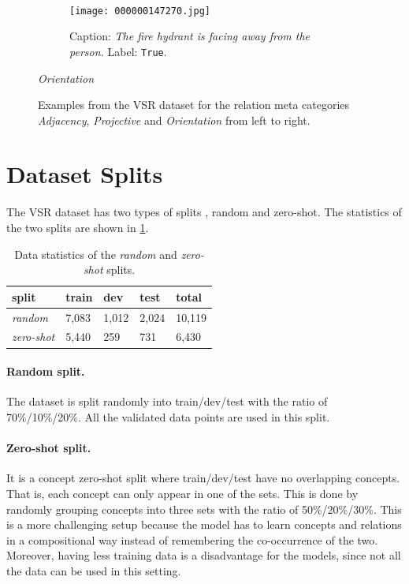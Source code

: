 \begin{figure}[ht]
\begin{minipage}[t]{.30\textwidth}
\begin{subfigure}[t]{\textwidth}
        \end{subfigure}\\
        \begin{subfigure}[t]{\textwidth}
        \centering
        \texttt{[image: 000000147270.jpg]}
        \caption{Caption: \textit{The fire hydrant is facing away from the person.} Label: \texttt{True}.}
        \end{subfigure}%
        \caption*{\textit{Orientation}}
    \end{minipage}%
    \caption{Examples from the VSR dataset for the relation meta categories \textit{Adjacency}, \textit{Projective} and \textit{Orientation} from left to right.}
    \label{fig:vsr-examples-2}
\end{figure}

\section{Dataset Splits} \label{sec:vsr_splits}

The VSR dataset has two types of splits \cite{liu2022visual}, random and zero-shot. The statistics of the two splits are shown in \cref{tab:data_splits}.

\begin{table}[ht]
\small
\centering
\begin{tabular}{lllll}
\toprule
 split & train & dev & test & total   \\
\midrule
\textit{random} & 7,083 & 1,012 & 2,024 & 10,119 \\
\textit{zero-shot} & 5,440 & 259 & 731  & 6,430\\
\bottomrule
\end{tabular}
\caption{Data statistics of the \textit{random} and \textit{zero-shot} splits. }
\label{tab:data_splits}
\end{table}

\paragraph{Random split.}
The dataset is split randomly into train/dev/test with the ratio of 70\%/10\%/20\%. All the validated data points are used in this split.

\paragraph{Zero-shot split.}
It is a concept zero-shot split where train/dev/test have no overlapping concepts. That is, each concept can only appear in one of the sets.
This is done by randomly grouping concepts into three sets with the ratio of 50\%/20\%/30\%.
This is a more challenging setup because the model has to learn concepts and relations in a compositional way instead of remembering the co-occurrence of the two.
Moreover, having less training data is a disadvantage for the models, since not all the data can be used in this setting.

